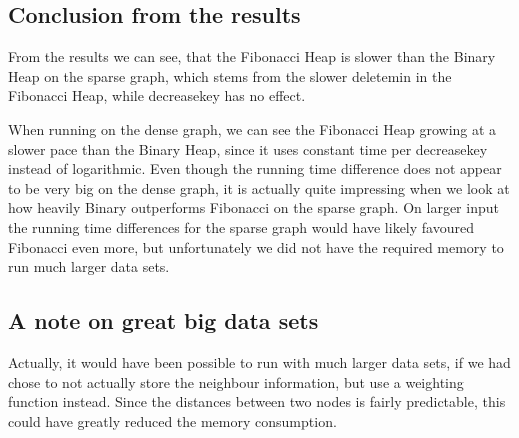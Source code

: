 \subsection{Conclusion from the results}

From the results we can see, that the Fibonacci Heap is slower than the Binary Heap on the sparse graph, which stems from the slower deletemin in the Fibonacci Heap, while decreasekey has no effect.

When running on the dense graph, we can see the Fibonacci Heap growing at a slower pace than the Binary Heap, since it uses constant time per decreasekey instead of logarithmic.
Even though the running time difference does not appear to be very big on the dense graph, it is actually quite impressing when we look at how heavily Binary outperforms Fibonacci on the sparse graph. On larger input the running time differences for the sparse graph would have likely favoured Fibonacci even more, but unfortunately we did not have the required memory to run much larger data sets.

\subsection{A note on great big data sets}

Actually, it would have been possible to run with much larger data sets, if we had chose to not actually store the neighbour information, but use a weighting function instead. Since the distances between two nodes is fairly predictable, this could have greatly reduced the memory consumption. 
